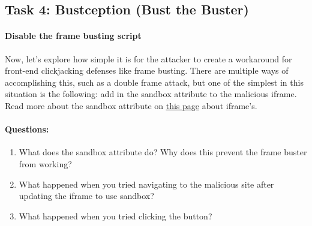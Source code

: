 \subsection{Task 4: Bustception (Bust the Buster)}

\paragraph{Disable the frame busting script}
Now, let's explore how simple it is for the attacker to create a workaround for front-end clickjacking defenses like frame busting. There are multiple ways of accomplishing this, such as a double frame attack, but one of the simplest in this situation is the following: add in the sandbox attribute to the malicious iframe. Read more about the sandbox attribute on  \underline{\href{https://developer.mozilla.org/en-US/docs/Web/HTML/Element/iframe}{this page}} about iframe's.



\paragraph{Questions:}
\begin{enumerate}
    \item What does the sandbox attribute do? Why does this prevent the frame buster from working?
    \item What happened when you tried navigating to the malicious site after updating the iframe to use sandbox?
    \item What happened when you tried clicking the button?
\end{enumerate}


